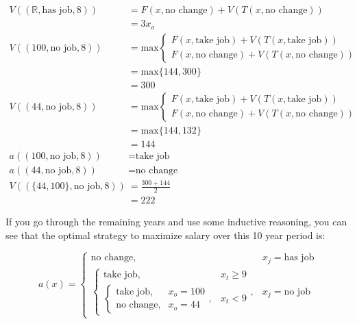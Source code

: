\documentclass[a4paper, 12pt]{article}
\begin{document}
\[
\begin{aligned}
  V((\mathbb{R}, \text{has job}, 8)) &= F(x, \text{no change}) + V(T(x, \text{no change})) \\
                                &= 3x_{o} \\
  V((100, \text{no job}, 8)) &= \text{max} \begin{cases}
    F(x, \text{take job}) + V(T(x, \text{take job})) \\
    F(x, \text{no change}) + V(T(x, \text{no change}))
  \end{cases} \\
                             &= \text{max}\{144, 300\} \\
                             &= 300 \\
  V((44, \text{no job}, 8)) &= \text{max} \begin{cases}
    F(x, \text{take job}) + V(T(x, \text{take job})) \\
    F(x, \text{no change}) + V(T(x, \text{no change}))
  \end{cases} \\
                             &= \text{max}\{144, 132\} \\
                             &= 144 \\
    a((100, \text{no job}, 8)) &= \text{take job} \\
    a((44, \text{no job}, 8)) &= \text{no change} \\
    V((\{44, 100\}, \text{no job}, 8)) &= \frac{300+144}{2} \\
                                       &= 222
\end{aligned}
\]

If you go through the remaining years and use some inductive reasoning, you can see that the optimal strategy to maximize salary over this 10 year period is:

\[
  a(x) = \begin{cases}
    \text{no change}, & x_{j} = \text{has job} \\
    \begin{cases}
      \text{take job}, & x_{t} \geq 9 \\
      \begin{cases}
        \text{take job}, & x_{o} = 100 \\
        \text{no change}, & x_{o} = 44
      \end{cases}, & x_{t} < 9
    \end{cases}, & x_{j} = \text{no job}
  \end{cases}
\]
\end{document}
